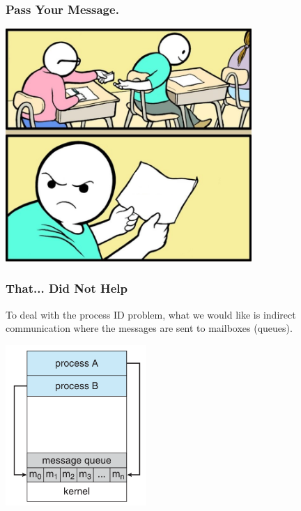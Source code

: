 \begin{frame}
\frametitle{Pass Your Message.}

\begin{center}
	\includegraphics[width=0.7\textwidth]{images/pass-message.png}
\end{center}

\end{frame}

\begin{frame}
\frametitle{That... Did Not Help}

To deal with the process ID problem, what we would like is \alert{indirect communication} where the messages are sent to mailboxes (queues).


\begin{center}
	\includegraphics[width=0.4\textwidth]{images/message-passing.png}
\end{center}


\end{frame}



